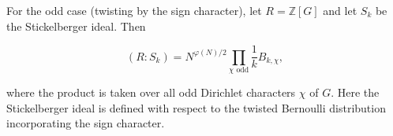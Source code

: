 For the odd case (twisting by the sign character), let $R = \mathbb{Z}[G]$ and let
$S_k$ be the Stickelberger ideal. Then

$$(R : S_k) = N^{\varphi(N)/2} \prod_{\chi \text{ odd}} \frac{1}{k} B_{k,\chi},$$

where the product is taken over all odd Dirichlet characters $\chi$ of $G$. Here the
Stickelberger ideal is defined with respect to the twisted Bernoulli distribution
incorporating the sign character.
